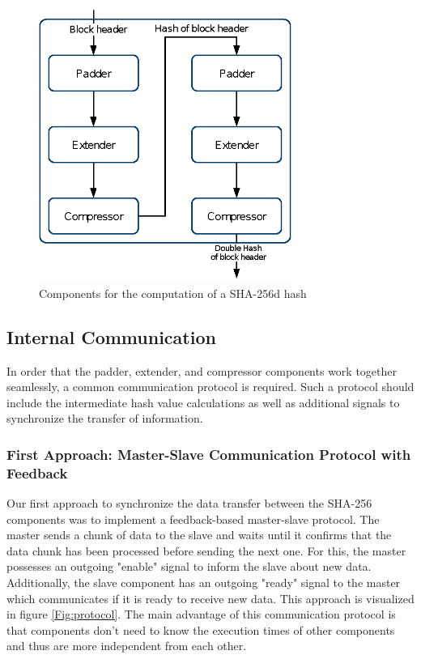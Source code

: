 \begin{figure}
    \centering
    \includegraphics[height=9cm]{img/Mining-core.eps}
    \caption[Components for the computation of a SHA-256d hash]{Components for the computation of a SHA-256d hash}
    \label{fig:mining-core}
\end{figure}

\subsection{Internal Communication}

\label{internal_com}

In order that the padder, extender, and compressor components work together seamlessly, a common communication protocol is required. Such a protocol should include the intermediate hash value calculations as well as additional signals to synchronize the transfer of information.

\subsubsection*{First Approach: Master-Slave Communication Protocol with Feedback}
Our first approach to synchronize the data transfer between the SHA-256 components was to implement a feedback-based master-slave protocol. The master sends a chunk of data to the slave and waits until it confirms that the data chunk has been processed before sending the next one. For this, the master possesses an outgoing "enable" signal to inform the slave about new data. Additionally, the slave component has an outgoing "ready" signal to the master which communicates if it is ready to receive new data. This approach is visualized in figure \ref{Fig:protocol}. The main advantage of this communication protocol is that components don't need to know the execution times of other components and thus are more independent from each other.

